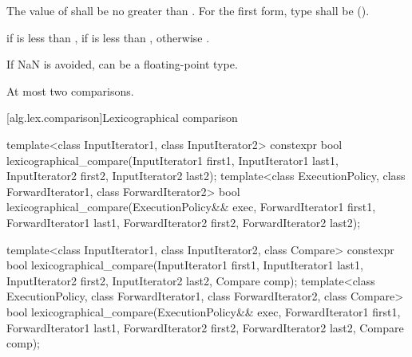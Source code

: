\begin{itemdescr}
\pnum
\requires
The value of  shall be no greater than .
For the first form, type 
shall be  ().

\pnum
\returns
{} if  is less than ,
 if  is less than ,
otherwise .

\pnum
\begin{note}
If NaN is avoided,  can be a floating-point type.
\end{note}

\pnum
\complexity
At most two comparisons.
\end{itemdescr}

[alg.lex.comparison]{Lexicographical comparison}

%
\begin{itemdecl}
template<class InputIterator1, class InputIterator2>
  constexpr bool
    lexicographical_compare(InputIterator1 first1, InputIterator1 last1,
                            InputIterator2 first2, InputIterator2 last2);
template<class ExecutionPolicy, class ForwardIterator1, class ForwardIterator2>
  bool
    lexicographical_compare(ExecutionPolicy&& exec,
                            ForwardIterator1 first1, ForwardIterator1 last1,
                            ForwardIterator2 first2, ForwardIterator2 last2);

template<class InputIterator1, class InputIterator2, class Compare>
  constexpr bool
    lexicographical_compare(InputIterator1 first1, InputIterator1 last1,
                            InputIterator2 first2, InputIterator2 last2,
                            Compare comp);
template<class ExecutionPolicy, class ForwardIterator1, class ForwardIterator2,
         class Compare>
  bool
    lexicographical_compare(ExecutionPolicy&& exec,
                            ForwardIterator1 first1, ForwardIterator1 last1,
                            ForwardIterator2 first2, ForwardIterator2 last2,
                            Compare comp);
\end{itemdecl}

